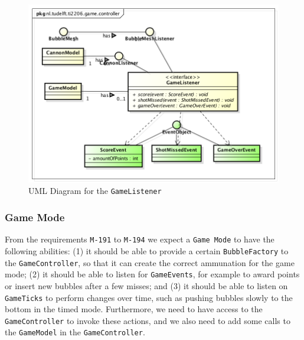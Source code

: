 \documentclass[a4paper]{article}
\begin{document}
\begin{figure}[H]
    \centering
    \includegraphics[scale=0.5]{GameListener.png}
    \caption{UML Diagram for the \texttt{GameListener}}
\end{figure}

\subsubsection{Game Mode}
\label{sec:gmmde}
From the requirements \texttt{M-191} to \texttt{M-194} we expect a \texttt{Game Mode} to have the following abilities: (1) it should be able to provide a certain \texttt{BubbleFactory} to the \texttt{GameController}, so that it can create the correct ammunation for the game mode; (2) it should be able to listen for \texttt{GameEvents}, for example to award points or insert new bubbles after a few misses; and (3) it should be able to listen on \texttt{GameTicks} to perform changes over time, such as pushing bubbles slowly to the bottom in the timed mode. Furthermore, we need to have access to the \texttt{GameController} to invoke these actions, and we also need to add some calls to the \texttt{GameModel} in the \texttt{GameController}.
\end{document}
